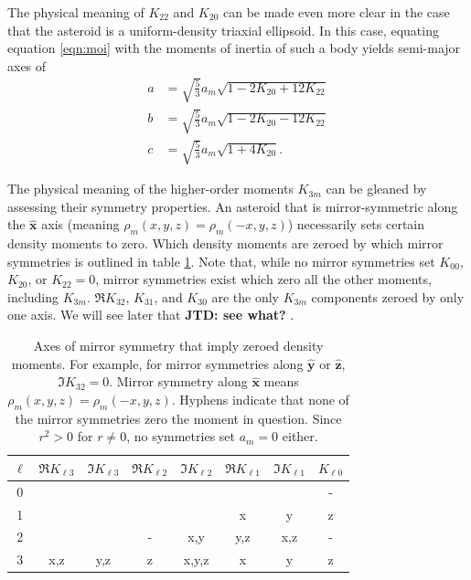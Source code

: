 \documentclass[fleqn,usenatbib]{mnras}
\newcommand{\jtd}[1]{ {\bf{\color{red} JTD: #1}} }
\newcommand{\unit}[1]{\bm{\hat{#1}}}
\begin{document}
The physical meaning of $K_{22}$ and $K_{20}$ can be made even more clear in the case that the asteroid is a uniform-density triaxial ellipsoid. In this case, equating equation \ref{eqn:moi} with the moments of inertia of such a body yields semi-major axes of 
\begin{equation}
  \begin{split}
  a &= \sqrt{\frac{5}{3}}a_m\sqrt{1-2K_{20}+12K_{22}}\\
  b &= \sqrt{\frac{5}{3}}a_m\sqrt{1-2K_{20}-12K_{22}}\\
  c &= \sqrt{\frac{5}{3}}a_m\sqrt{1+4K_{20}}.
  \label{eqn:ellipsoid-axes}
  \end{split}
\end{equation}

The physical meaning of the higher-order moments $K_{3m}$ can be gleaned by assessing their symmetry properties. An asteroid that is mirror-symmetric along the $\unit{x}$ axis (meaning $\rho_m(x,y,z)=\rho_m(-x,y,z)$) necessarily sets certain density moments to zero. Which density moments are zeroed by which mirror symmetries is outlined in table \ref{tab:klm-symmetries}. Note that, while no mirror symmetries set $K_{00}$, $K_{20}$, or $K_{22}=0$, mirror symmetries exist which zero all the other moments, including $K_{3m}$. $\Re K_{32}$, $K_{31}$, and $K_{30}$ are the only $K_{3m}$ components zeroed by only one axis. We will see later that \jtd{see what?}.
\begin{table}
  \centering
  \begin{tabular}{c|ccccccc}
    \hline
    $\ell$ & $\Re K_{\ell 3}$ & $\Im K_{\ell 3}$ & $\Re K_{\ell 2}$ & $\Im K_{\ell 2}$ & $\Re K_{\ell 1}$ & $\Im K_{\ell 1}$ & $K_{\ell 0}$ \\ \hline
    0 &  &  &  &  &  &  & -\\ 
    1 &  &  &  &  & x & y & z\\ 
    2 &  &  & - & x,y & y,z & x,z & -\\ 
    3 & x,z & y,z & z & x,y,z & x & y & z\\ \hline
  \end{tabular}
  \caption{Axes of mirror symmetry that imply zeroed density moments. For example, for mirror symmetries along $\unit y$ or $\unit z$, $\Im K_{32}=0$. Mirror symmetry along $\unit x$ means $\rho_m(x, y, z) = \rho_m(-x, y, z)$. Hyphens indicate that none of the mirror symmetries zero the moment in question. Since $r^2>0$ for $r\neq 0$, no symmetries set $a_m=0$ either.}
  \label{tab:klm-symmetries}
\end{table} 
\end{document}
